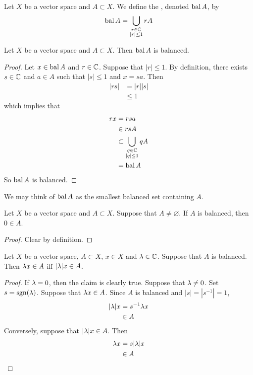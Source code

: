 \documentclass{book}
\begin{document}
	\begin{defn}
		Let $X$ be a vector space and $A \subset X$. We define the , denoted $\operatorname{bal} A$, by $$\operatorname{bal} A = \bigcup_{\substack{r \in \mathbb{C} \\ |r| \leq 1}} rA$$
	\end{defn}

	\begin{ex}
		Let $X$ be a vector space and $A \subset X$. Then $\operatorname{bal} A$ is balanced. 
	\end{ex}

	\begin{proof}
		Let $x \in \operatorname{bal} A$ and $r \in \mathbb{C}$. Suppose that $|r| \leq 1$. By definition, there exists $s \in \mathbb{C}$ and $a \in A$ such that $|s| \leq 1$ and $x = sa$. Then 
		\begin{align*}
			|rs| 
			&= |r||s| \\
			&\leq 1
		\end{align*}
		which implies that
		\begin{align*}
			rx 
			&= rsa \\
			& \in rsA \\
			& \subset \bigcup_{\substack{q \in \mathbb{C} \\ |q| \leq 1}} qA \\
			&= \operatorname{bal} A
		\end{align*}
		So $\operatorname{bal} A$ is balanced.
	\end{proof}
	
	\begin{note}
		We may think of $\operatorname{bal} A$ as the smallest balanced set containing $A$. 
	\end{note}
	
	\begin{ex}
		Let $X$ be a vector space and $A \subset X$. Suppose that $A \neq \varnothing$. If $A$ is balanced, then $0 \in A$.
	\end{ex}
	
	\begin{proof}
		Clear by definition.
	\end{proof}

	\begin{ex}
		Let $X$ be a vector space, $A \subset X$, $x \in X$ and $\lambda \in \mathbb{C}$. Suppose that $A$ is balanced. Then $\lambda x \in A$ iff $|\lambda| x \in A$.  
	\end{ex}
	
	\begin{proof}
		If $\lambda = 0$, then the claim is clearly true. Suppose that $\lambda \neq 0$. Set $s = \operatorname{sgn}(\lambda)$. Suppose that $\lambda x \in A$. Since $A$ is balanced and $|s| = |s^{-1}| = 1$, 
		\begin{align*}
			|\lambda|x 
			&= s^{-1} \lambda x \\
			& \in A
		\end{align*}
		Conversely, suppose that $|\lambda| x \in A$. Then 
		\begin{align*}
			\lambda x 
			&= s |\lambda| x \\
			& \in A
		\end{align*}
	\end{proof}
\end{document}
